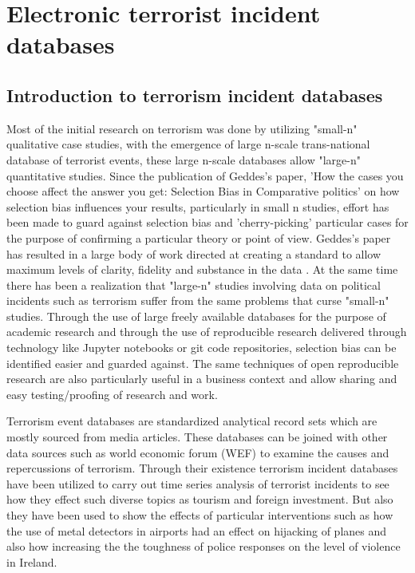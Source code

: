 \chapter{Electronic terrorist incident databases}

\section{Introduction to terrorism incident databases}
Most of the initial research on terrorism was done by utilizing "small-n" qualitative case studies, with the emergence of large n-scale trans-national database of terrorist events, these large n-scale databases allow "large-n" quantitative studies. 
Since the publication of Geddes's paper, 'How the cases you choose affect the answer you get: Selection Bias in Comparative politics' \citep{geddes1990cases} on how selection bias influences your results, particularly in small n studies, effort has been made to guard against selection bias and 'cherry-picking' particular cases for the purpose of confirming a particular theory or point of view. Geddes's paper has resulted in a large body of work directed at creating a standard to allow maximum levels of clarity, fidelity and substance in the data \citep{geddes1990cases}. At the same time there has been a realization that "large-n" studies involving data on political incidents such as terrorism suffer from the same problems that curse "small-n" studies. Through the use of large freely available databases for the purpose of academic research and through the use of reproducible research delivered through technology like Jupyter notebooks \citep{kluyver2016jupyter} or git code repositories,  selection bias can be identified easier and guarded against. The same techniques of open reproducible research are also particularly useful in a business context and allow sharing and easy testing/proofing of research and work. 
 
Terrorism event databases are standardized analytical record sets which are mostly sourced from media articles. These databases can be joined with other data sources such as world economic forum (WEF) to examine the causes and repercussions of terrorism. Through their existence terrorism incident databases have been utilized to carry out time series analysis of terrorist incidents to see how they effect such diverse topics as tourism \citep{van2015terrorism} and foreign investment. But also they have been used to show the effects of particular interventions such as how the use of metal detectors in airports had an effect on hijacking of planes and also how increasing the the toughness of police responses on the level of violence in Ireland.

